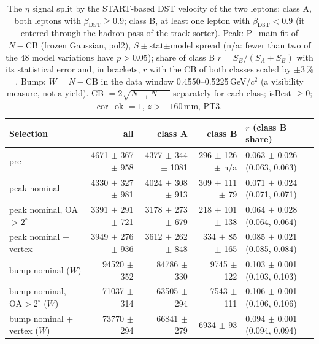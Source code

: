 \begin{table}[H]
\centering
\caption{The $\eta$ signal split by the START-based DST velocity of the two leptons: class A, both leptons with $\beta_{\mathrm{DST}}\geq 0.9$; class B, at least one lepton with $\beta_{\mathrm{DST}}<0.9$ (it entered through the hadron pass of the track sorter). Peak: P\_main fit of $N-\mathrm{CB}$ (frozen Gaussian, pol2), $S\pm$stat$\pm$model spread (n/a: fewer than two of the 48 model variations have $p>0.05$); share of class B $r=S_B/(S_A+S_B)$ with its statistical error and, in brackets, $r$ with the CB of both classes scaled by $\pm3\,\%$. Bump: $W=N-\mathrm{CB}$ in the data window 0.4550--0.5225\,GeV/$c^2$ (a visibility measure, not a yield). CB $=2\sqrt{N_{++}N_{--}}$ separately for each class; isBest $\geq 0$; cor\_ok $=1$, $z>-160$\,mm, PT3.}
\label{tab:pid_peak_dstbeta}
\footnotesize
\setlength{\tabcolsep}{4pt}
\begin{tabular}{@{}l r r r l@{}}
\toprule
Selection & all & class A & class B & $r$ (class B share) \\
\midrule
pre & 4671 $\pm$ 367 $\pm$ 958 & 4377 $\pm$ 344 $\pm$ 1081 & 296 $\pm$ 126 $\pm$ n/a & 0.063 $\pm$ 0.026 (0.063, 0.063) \\
peak nominal & 4330 $\pm$ 327 $\pm$ 981 & 4024 $\pm$ 308 $\pm$ 913 & 309 $\pm$ 111 $\pm$ 79 & 0.071 $\pm$ 0.024 (0.071, 0.071) \\
peak nominal, OA$>2^\circ$ & 3391 $\pm$ 291 $\pm$ 721 & 3178 $\pm$ 273 $\pm$ 679 & 218 $\pm$ 101 $\pm$ 138 & 0.064 $\pm$ 0.028 (0.064, 0.064) \\
peak nominal + vertex & 3949 $\pm$ 276 $\pm$ 936 & 3612 $\pm$ 262 $\pm$ 848 & 334 $\pm$ 85 $\pm$ 165 & 0.085 $\pm$ 0.021 (0.085, 0.084) \\
bump nominal ($W$) & 94520 $\pm$ 352 & 84786 $\pm$ 330 & 9745 $\pm$ 122 & 0.103 $\pm$ 0.001 (0.103, 0.103) \\
bump nominal, OA$>2^\circ$ ($W$) & 71037 $\pm$ 314 & 63505 $\pm$ 294 & 7543 $\pm$ 111 & 0.106 $\pm$ 0.001 (0.106, 0.106) \\
bump nominal + vertex ($W$) & 73770 $\pm$ 294 & 66841 $\pm$ 279 & 6934 $\pm$ 93 & 0.094 $\pm$ 0.001 (0.094, 0.094) \\
\bottomrule
\end{tabular}
\end{table}
